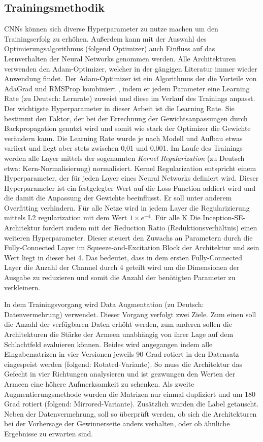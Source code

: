 \subsection{Trainingsmethodik}

CNNs können sich diverse Hyperparameter zu nutze machen um den Trainingserfolg zu erhöhen. Außerdem kann mit der Auswahl des Optimierungsalgorithmus (folgend Optimizer) auch Einfluss auf das Lernverhalten der Neural Networks genommen werden. Alle Architekturen verwenden den Adam-Optimizer, welcher in der gängigen Literatur immer wieder Anwendung findet. Der Adam-Optimizer ist ein Algorithmus der die Vorteile von AdaGrad und RMSProp kombiniert \parencite{DBLP:journals/corr/KingmaB14}, indem er jedem Parameter eine Learning Rate (zu Deutsch: Lernrate) zuweist und diese im Verlauf des Trainings anpasst. Der wichtigste Hyperparameter in dieser Arbeit ist die Learning Rate. Sie bestimmt den Faktor, der bei der Errechnung der Gewichtsanpassungen durch Backpropagation genutzt wird und somit wie stark der Optimizer die Gewichte verändern kann. Die Learning Rate wurde je nach Modell und Aufbau etwas variiert und liegt aber stets zwischen 0,01 und 0,001. Im Laufe des Trainings werden alle Layer mittels der sogenannten \textit{Kernel Regularization} (zu Deutsch etwa: Kern-Normalisierung) normalisiert. Kernel Regularization entspricht einem Hyperparameter, der für jeden Layer eines Neural Networks definiert wird. Dieser Hyperparameter ist ein festgelegter Wert auf die Loss Function addiert wird und die damit die Anpassung der Gewichte beeinflusst. Er soll unter anderem Overfitting verhindern. Für alle Netze wird in jedem Layer die Regularizierung mittels L2 regularization mit dem Wert  $1\times e^{-4}$. Für alle K Die Inception-SE-Architektur fordert zudem mit der Reduction Ratio (Reduktionsverhältnis) einen weiteren Hyperparameter. Dieser steuert den Zuwachs an Parametern durch die Fully-Connected Layer im Squeeze-and-Excitation Block der Architektur und sein Wert liegt in dieser bei 4. Das bedeutet, dass in dem ersten Fully-Connected Layer die Anzahl der Channel durch 4 geteilt wird um die Dimensionen der Ausgabe zu reduzieren und somit die Anzahl der benötigten Parameter zu verkleinern. 

In dem Trainingsvorgang wird Data Augmentation (zu Deutsch: Datenvermehrung) verwendet. Dieser Vorgang verfolgt zwei Ziele. Zum einen soll die Anzahl der verfügbaren Daten erhöht werden, zum anderen sollen die Architekturen die Stärke der Armeen unabhängig von ihrer Lage auf dem Schlachtfeld evaluieren können. Beides wird angegangen indem alle Eingabematrizen in vier Versionen jeweils 90 Grad rotiert in den Datensatz eingespeist werden (folgend: Rotated-Variante). So muss die Architektur das Gefecht in vier Richtungen analysieren und ist gezwungen den Werten der Armeen eine höhere Aufmerksamkeit zu schenken. Als zweite Augmentierungsmethode wurden die Matrizen nur einmal dupliziert und um 180 Grad rotiert (folgend: Mirrored-Variante). Zusätzlich wurden die Label getauscht. Neben der Datenvermehrung, soll so überprüft werden, ob sich die Architekturen bei der Vorhersage der Gewinnerseite anders verhalten, oder ob ähnliche Ergebnisse zu erwarten sind.


